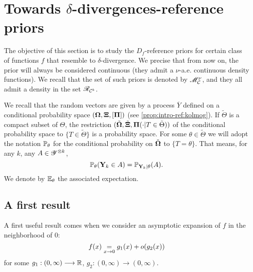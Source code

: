 \section{Towards $\delta$-divergences-reference priors}


The objective of this section is to study the $D_f$-reference priors for certain class of functions $f$ that resemble to $\delta$-divergence.
We precise that from now on, the prior will always be considered continuous (they admit a $\nu$-a.e. continuous density functions). We recall that the set of such priors is denoted by $\mathscr{M}^\nu_{\mathcal{C}} $, and they all admit a density in the set $\mathscr{R}_{\mathcal{C}^b}$. %

We recall that the random vectors are given by a process $\overline{Y}$ defined on a conditional probability space $(\mathbf{\Omega},\mathbf{\Xi},[\mathbf{\Pi}] )$ (see \cref{prop:intro-ref:kolmog}). If $\tilde\Theta$ is a compact subset of $\Theta$, the restriction $(\tilde{\mathbf{\Omega}},\tilde{\mathbf{\Xi}}, \mathbf{\Pi}(\cdot|T\in\tilde\Theta))$ of the conditional probability space to $\{T\in\tilde\Theta\}$ is a probability space.
For some $\theta\in\tilde\Theta$ we will adopt the notation $\mathbb{P}_\theta$ for the conditional probability on $\tilde{\mathbf{\Omega}}$ to $\{T=\theta\}$. That means, for any $k$, any $A\in\mathscr{Y}^{\otimes k}$, 
    \begin{equation}
        \mathbb{P}_\theta(\mathbf{Y}_k\in A) = \mathbb{P}_{\mathbf{Y}_k|\theta}(A).
    \end{equation}
We denote by $\mathbb{E}_\theta$ the associated expectation.



\subsection{A first result}

A first useful result comes when we consider an asymptotic expansion of $f$ in the neighborhood of $0$:
\begin{equation}
    f(x) \overset{}{\underset{x\rightarrow0}{=}} g_1(x) + o(g_2(x))
\end{equation}
for some $g_1:(0,\infty)\longrightarrow\mathbb{R}$, $g_2:(0,\infty)\to(0,\infty)$.


